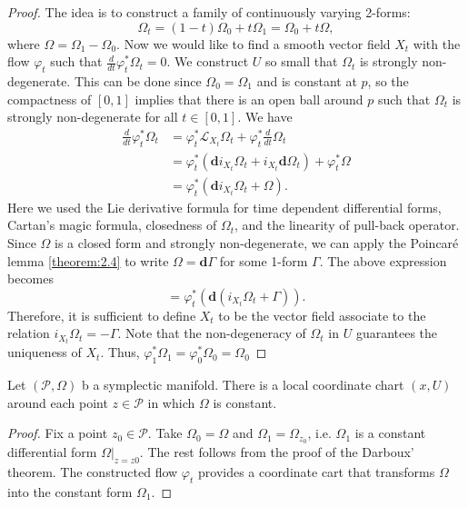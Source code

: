 \begin{proof}
The idea is to construct a family of continuously varying 2-forms:
\begin{equation*}
\Omega_t = (1-t)\Omega_0 + t\Omega_1 = \Omega_0 + t \Omega,
\end{equation*}
where $\Omega = \Omega_1 - \Omega_0$. Now we would like to find a smooth vector field $X_t$ with the flow $\varphi_t$ such that $\frac{d}{dt} \varphi_t^*\Omega_t = 0$. We construct $U$ so small that $\Omega_t$ is strongly non-degenerate. This can be done since $\Omega_0 = \Omega_1$ and is constant at $p$, so the compactness of $[0,1]$ implies that there is an open ball around $p$ such that $\Omega_t$ is strongly non-degenerate for all $t\in [0,1]$. We have
\begin{equation*}
\begin{aligned}
	\frac{d}{dt} \varphi_t^*\Omega_t &= \varphi_t^* \mathcal L_{X_t} \Omega_t + \varphi_t^* \frac{d}{dt} \Omega_t \\
	&= \varphi_t^*( \mathbf d i_{X_t}\Omega_t + i_{X_t} \mathbf d \Omega_t ) + \varphi_t^* \Omega \\
	&= \varphi_t^*( \mathbf d i_{X_t}\Omega_t + \Omega ).
\end{aligned}
\end{equation*}
Here we used the Lie derivative formula for time dependent differential forms, Cartan's magic formula, closedness of $\Omega_t$, and the linearity of pull-back operator. Since $\Omega$ is a closed form and strongly non-degenerate, we can apply the Poincar\'e lemma \ref{theorem:2.4} to write $\Omega = \mathbf d \Gamma$ for some 1-form $\Gamma$. The above expression becomes
\begin{equation*}
	= \varphi_t^*( \mathbf d ( i_{X_t}\Omega_t + \Gamma ) ).
\end{equation*}
Therefore, it is sufficient to define $X_t$ to be the vector field associate to the relation $i_{X_t}\Omega_t = - \Gamma$. Note that the non-degeneracy of $\Omega_t$ in $U$ guarantees the uniqueness of $X_t$. Thus, $\varphi_1^* \Omega_1 = \varphi_0^* \Omega_0 = \Omega_0$
\end{proof}

\begin{corollary} \label{theorem:2.6}
Let $(\mathcal P, \Omega)$ b a symplectic manifold. There is a local coordinate chart $(x,U)$ around each point $z\in\mathcal P$ in which $\Omega$ is constant.
\end{corollary}
\begin{proof}
Fix a point $z_0 \in \mathcal P$. Take $\Omega_0 = \Omega$ and $\Omega_1 = \Omega_{z_0}$, i.e. $\Omega_1$ is a constant differential form $\Omega|_{z = z0}$. The rest follows from the proof of the Darboux' theorem. The constructed flow $\varphi_t$ provides a coordinate cart that transforms $\Omega$ into the constant form $\Omega_1$.
\end{proof}

